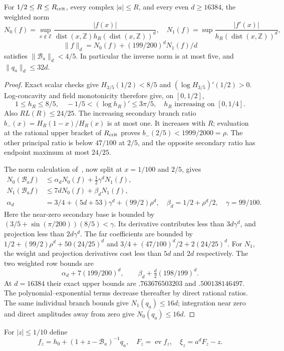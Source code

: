 \documentclass[11pt,a4paper]{article}
\newcommand{\ev}{\operatorname{ev}}\newcommand{\GG}{\mathcal G}
\newcommand{\dist}{\operatorname{dist}}\newcommand{\Rea}{\operatorname{Re}}
\begin{document}
\begin{lemma}\label{lem:fullgreen}
For $1/2\le R\le R_{\rm crit}$, every complex $|a|\le R$, and every even $d\ge16384$, the weighted norm
\[
 N_0(f)=\sup_{x\notin\mathbb Z}\frac{|f(x)|}{\dist(x,\mathbb Z)h_R(\dist(x,\mathbb Z))^d},
 \quad N_1(f)=\sup\frac{|f'(x)|}{h_R(\dist(x,\mathbb Z))^d},
\]
\[
 \|f\|_d=N_0(f)+(199/200)^dN_1(f)/d
\]
satisfies $\|\mathcal B_a\|_d<4/5$. In particular the inverse norm is at most five, and $\|q_a\|_d\le32d$.
\end{lemma}
\begin{proof}
Exact scalar checks give $H_{3/5}(1/2)<8/5$ and $(\log H_{3/5})'(1/2)>0$. Log-concavity and field monotonicity therefore give, on $[0,1/2]$,
\[
 1\le h_R\le8/5,\quad -1/5<(\log h_R)'\le3\pi/5,
 \quad h_R\text{ increasing on }[0,1/4].
\]
Also $RL(R)\le24/25$. The increasing secondary branch ratio $b_-(x)=H_R(1-x)/H_R(x)$ is at most one. It increases with $R$; evaluation at the rational upper bracket of $R_{\rm crit}$ proves $b_-(2/5)<1999/2000=\rho$. The other principal ratio is below $47/100$ at $2/5$, and the opposite secondary ratio has endpoint maximum at most $24/25$.

The norm calculation of~\cite{Clusters}, now split at $x=1/100$ and $2/5$, gives
\begin{align*}
 N_0(\mathcal B_af)&\le\alpha_dN_0(f)+\tfrac12\gamma^dN_1(f),\\
 N_1(\mathcal B_af)&\le7dN_0(f)+\beta_dN_1(f),\\
 \alpha_d&=3/4+(5d+53)\gamma^d+(99/2)\rho^d,\quad
 \beta_d=1/2+\rho^d/2,\quad \gamma=99/100.
\end{align*}
Here the near-zero secondary base is bounded by
$(3/5+\sin(\pi/200))(8/5)<\gamma$. Its derivative contributes less than $3d\gamma^d$, and projection less than $2d\gamma^d$. The far coefficients are bounded by
$1/2+(99/2)\rho^d+50(24/25)^d$ and
$3/4+(47/100)^d/2+2(24/25)^d$.
For $N_1$, the weight and projection derivatives cost less than $5d$ and $2d$ respectively.
The two weighted row bounds are
\[
 \alpha_d+7(199/200)^d,\qquad
 \beta_d+\tfrac d2(198/199)^d.
\]
At $d=16384$ their exact upper bounds are $.763676503203$ and $.500138146497$. The polynomial--exponential terms decrease thereafter by direct rational ratios. The same individual branch bounds give $N_1(q_a)\le16d$; integration near zero and direct amplitudes away from zero give $N_0(q_a)\le16d$.
\end{proof}
For $|z|\le1/10$ define
\[
 f_z=h_0+(1+z-\mathcal B_a)^{-1}q_a,\quad F_z=\ev f_z,
 \quad \xi_z=a^dF_z-z.
\]
\end{document}
